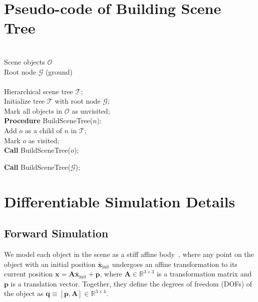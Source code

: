 \section{Pseudo-code of Building Scene Tree}



\begin{algorithm}[h]
\caption{Build Scene Tree}\label{alg:build_scene_tree}
\begin{algorithmic}[1]

\REQUIRE~~\\
Scene objects $\mathcal{O}$\\
Root node \( \mathscr{G} \) (ground)\\
\ENSURE~~\\
Hierarchical scene tree $\mathcal{T}$;\\

\STATE Initialize tree $\mathcal{T}$ with root node \( \mathscr{G} \); \\
\STATE Mark all objects in $\mathcal{O}$ as unvisited; \\

\STATE \textbf{Procedure} BuildSceneTree($n$): \\
            \STATE Add $o$ as a child of $n$ in $\mathcal{T}$; \\
            \STATE Mark $o$ as visited; \\
            \STATE \textbf{Call} BuildSceneTree($o$); \\
        \ENDIF
    \ENDFOR

\STATE \textbf{Call} BuildSceneTree(\( \mathscr{G} \)); \\

\end{algorithmic}
\end{algorithm}

\section{Differentiable Simulation Details}\label{sec:diff_sim_detail}

\subsection{Forward Simulation}
We model each object in the scene as a stiff affine body~\cite{abd}, where any point on the object with an initial position $\bar{\mathbf{x}}_\text{init}$ undergoes an affine transformation to its current position
$\mathbf{x} = \mathbf{A}\bar{\mathbf{x}}_\text{init} + \mathbf{p}$,
where $\mathbf{A} \in \mathbb{R}^{3 \times 3}$ is a transformation matrix and $\mathbf{p}$ is a translation vector. Together, they define the degrees of freedom (DOFs) of the object as $\mathbf{q} \equiv [\mathbf{p}, \mathbf{A}] \in \mathbb{R}^{3 \times 4}$.

